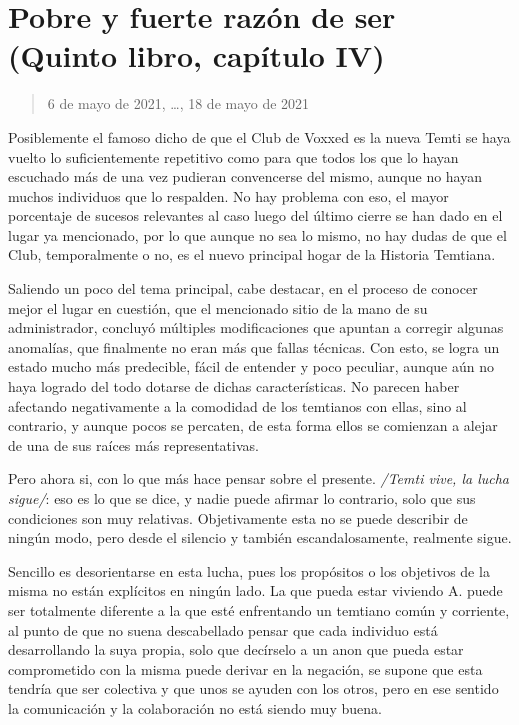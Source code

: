 \documentclass[
  spanish,
]{book}
\begin{document}
\hypertarget{pobre-y-fuerte-razuxf3n-de-ser-quinto-libro-capuxedtulo-iv}{%
\section{Pobre y fuerte razón de ser (Quinto libro, capítulo IV)}\label{pobre-y-fuerte-razuxf3n-de-ser-quinto-libro-capuxedtulo-iv}}

\begin{quote}
6 de mayo de 2021, \ldots, 18 de mayo de 2021
\end{quote}

Posiblemente el famoso dicho de que el Club de Voxxed es la nueva Temti se haya vuelto lo suficientemente repetitivo como para que todos los que lo hayan escuchado más de una vez pudieran convencerse del mismo, aunque no hayan muchos individuos que lo respalden. No hay problema con eso, el mayor porcentaje de sucesos relevantes al caso luego del último cierre se han dado en el lugar ya mencionado, por lo que aunque no sea lo mismo, no hay dudas de que el Club, temporalmente o no, es el nuevo principal hogar de la Historia Temtiana.

Saliendo un poco del tema principal, cabe destacar, en el proceso de conocer mejor el lugar en cuestión, que el mencionado sitio de la mano de su administrador, concluyó múltiples modificaciones que apuntan a corregir algunas anomalías, que finalmente no eran más que fallas técnicas. Con esto, se logra un estado mucho más predecible, fácil de entender y poco peculiar, aunque aún no haya logrado del todo dotarse de dichas características. No parecen haber afectando negativamente a la comodidad de los temtianos con ellas, sino al contrario, y aunque pocos se percaten, de esta forma ellos se comienzan a alejar de una de sus raíces más representativas.

Pero ahora si, con lo que más hace pensar sobre el presente. \emph{/Temti vive, la lucha sigue/}: eso es lo que se dice, y nadie puede afirmar lo contrario, solo que sus condiciones son muy relativas. Objetivamente esta no se puede describir de ningún modo, pero desde el silencio y también escandalosamente, realmente sigue.

Sencillo es desorientarse en esta lucha, pues los propósitos o los objetivos de la misma no están explícitos en ningún lado. La que pueda estar viviendo A. puede ser totalmente diferente a la que esté enfrentando un temtiano común y corriente, al punto de que no suena descabellado pensar que cada individuo está desarrollando la suya propia, solo que decírselo a un anon que pueda estar comprometido con la misma puede derivar en la negación, se supone que esta tendría que ser colectiva y que unos se ayuden con los otros, pero en ese sentido la comunicación y la colaboración no está siendo muy buena.
\end{document}
